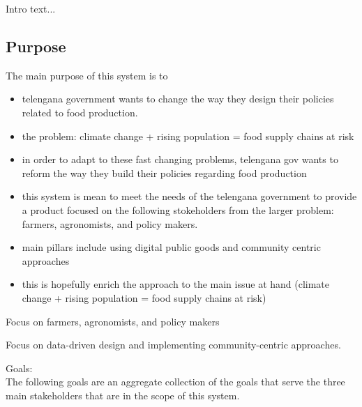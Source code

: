 Intro text...

\subsection{Purpose}

The main purpose of this system is to 
\begin{itemize}
\item
telengana government wants to change the way they design their policies related to food production. 
\item

the problem: climate change + rising population = food supply chains at risk
\item

in order to adapt to these fast changing problems, telengana gov wants to reform the way they build their policies regarding food production
\item

this system is mean to meet the needs of the telengana government to provide a product focused on the following stokeholders from the larger problem: farmers, agronomists, and policy makers. 
\item
main pillars include using digital public goods and community centric approaches
\item
this is hopefully enrich the approach to the main issue at hand (climate change + rising population = food supply chains at risk)
\end{itemize}
\begin{flushleft}

\medskip
Focus on farmers, agronomists, and policy makers\\
\medskip

Focus on data-driven design and implementing community-centric approaches.\\
\medskip

Goals: \\
The following goals are an aggregate collection of the goals that serve the three main stakeholders that are in the scope of this system.
\end{flushleft}
